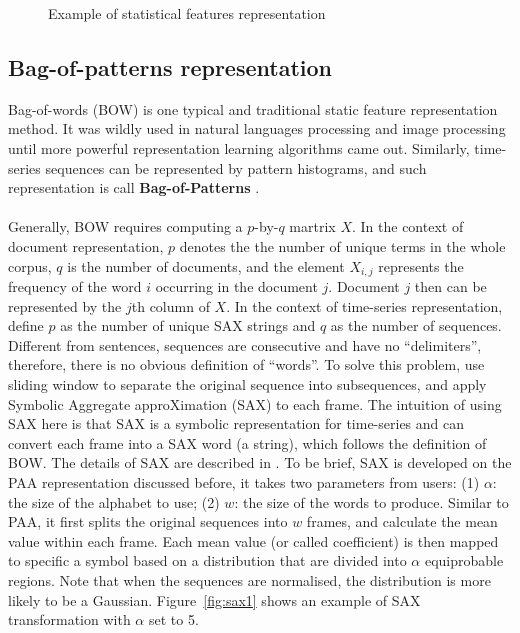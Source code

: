 \begin{figure}[!htbp]
    \centering 
    \caption{Example of statistical features representation} 
    \label{fig:nycbelp1} 
\end{figure} 

\subsection{Bag-of-patterns representation}
Bag-of-words (BOW) is one typical and traditional static feature representation method. It was wildly used in natural languages processing and image processing until more powerful representation learning algorithms came out. Similarly, time-series sequences can be represented by pattern histograms, and such representation is call \textbf{Bag-of-Patterns} \cite{lin2012rotation}.\\
\\Generally, BOW requires computing a $p$-by-$q$ martrix $X$. In the context of document representation, $p$ denotes the the number of unique terms in the whole corpus, $q$ is the number of documents, and the element $X_{i,j}$ represents the frequency of the word $i$ occurring in the document $j$. Document $j$ then can be represented by the $j$th column of $X$. In the context of time-series representation, \cite{lin2012rotation} define $p$ as the number of unique SAX strings and $q$ as the number of sequences. Different from sentences, sequences are consecutive and have no ``delimiters'', therefore, there is no obvious definition of ``words''. To solve this problem, \cite{lin2012rotation} use sliding window to separate the original sequence into subsequences, and apply Symbolic Aggregate approXimation (SAX) to each frame. The intuition of using SAX here is that SAX is a symbolic representation for time-series and can convert each frame into a SAX word (a string), which follows the definition of BOW. The details of SAX are described in \cite{lin2007experiencing}. To be brief, SAX is developed on the PAA representation discussed before, it takes two parameters from users: (1) $\alpha$: the size of the alphabet to use; (2) $w$: the size of the words to produce. Similar to PAA, it first splits the original sequences into $w$ frames, and calculate the mean value within each frame. Each mean value (or called coefficient) is then mapped to specific a symbol based on a distribution that are divided into $\alpha$ equiprobable regions. Note that when the sequences are normalised, the distribution is more likely to be a Gaussian. Figure~\ref{fig:sax1} shows an example of SAX transformation with $\alpha$ set to 5. \\
